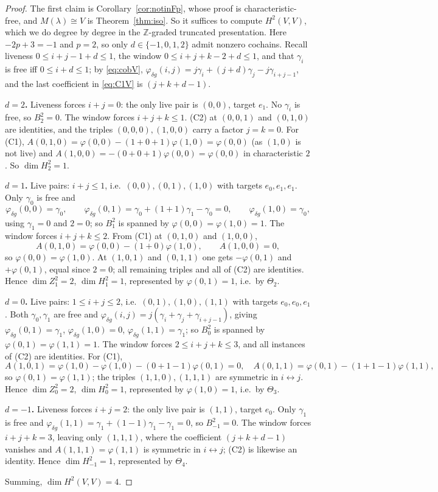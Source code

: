 \documentclass[11pt,reqno]{amsart}
\theoremstyle{plain}
\theoremstyle{definition}
\newcommand{\Zt}{Z^2}
\newcommand{\Bt}{B^2}
\newcommand{\Ht}{H^2}
\begin{document}
\begin{proof}
The first claim is Corollary~\ref{cor:notinFp}, whose proof is characteristic-free, and
$M(\lambda)\cong V$ is Theorem~\ref{thm:iso}. So it suffices to compute $\Ht(V,V)$, which we
do degree by degree in the $\mathbb{Z}$-graded truncated presentation. Here
$-2p+3=-1$ and $p=2$, so only $d\in\{-1,0,1,2\}$ admit nonzero cochains. Recall liveness
$0\le i+j-1+d\le1$, the window $0\le i+j+k-2+d\le1$, and that $\gamma_i$ is free iff
$0\le i+d\le1$; by \eqref{eq:cobV},
$\varphi_{\delta g}(i,j)=j\gamma_i+(j+d)\gamma_j-j\gamma_{i+j-1}$, and the last coefficient
in \eqref{eq:C1V} is $(j+k+d-1)$.

\textbf{$d=2$.} Liveness forces $i+j=0$: the only live pair is $(0,0)$, target $e_1$. No
$\gamma_i$ is free, so $\Bt_2=0$. The window forces $i+j+k\le1$. (C2) at $(0,0,1)$ and
$(0,1,0)$ are identities, and the triples $(0,0,0),(1,0,0)$ carry a factor $j=k=0$. For
(C1), $A(0,1,0)=\varphi(0,0)-(1+0+1)\varphi(1,0)=\varphi(0,0)$ (as $(1,0)$ is not live) and
$A(1,0,0)=-(0+0+1)\varphi(0,0)=\varphi(0,0)$ in characteristic $2$. So $\dim\Ht_2=1$.

\textbf{$d=1$.} Live pairs: $i+j\le1$, i.e.\ $(0,0),(0,1),(1,0)$ with targets $e_0,e_1,e_1$.
Only $\gamma_0$ is free and
\[
\varphi_{\delta g}(0,0)=\gamma_0,\qquad
\varphi_{\delta g}(0,1)=\gamma_0+(1+1)\gamma_1-\gamma_0=0,\qquad
\varphi_{\delta g}(1,0)=\gamma_0,
\]
using $\gamma_1=0$ and $2=0$; so $\Bt_1$ is spanned by $\varphi(0,0)=\varphi(1,0)=1$. The
window forces $i+j+k\le2$. From (C1) at $(0,1,0)$ and $(1,0,0)$,
\[
A(0,1,0)=\varphi(0,0)-(1+0)\varphi(1,0),\qquad A(1,0,0)=0,
\]
so $\varphi(0,0)=\varphi(1,0)$. At $(1,0,1)$ and $(0,1,1)$ one gets $-\varphi(0,1)$ and
$+\varphi(0,1)$, equal since $2=0$; all remaining triples and all of (C2) are identities.
Hence $\dim\Zt_1=2$, $\dim\Ht_1=1$, represented by $\varphi(0,1)=1$, i.e.\ by $\Theta_2$.

\textbf{$d=0$.} Live pairs: $1\le i+j\le2$, i.e.\ $(0,1),(1,0),(1,1)$ with targets
$e_0,e_0,e_1$. Both $\gamma_0,\gamma_1$ are free and
$\varphi_{\delta g}(i,j)=j(\gamma_i+\gamma_j+\gamma_{i+j-1})$, giving
$\varphi_{\delta g}(0,1)=\gamma_1$, $\varphi_{\delta g}(1,0)=0$,
$\varphi_{\delta g}(1,1)=\gamma_1$; so $\Bt_0$ is spanned by
$\varphi(0,1)=\varphi(1,1)=1$. The window forces $2\le i+j+k\le3$, and all instances of (C2)
are identities. For (C1),
\[
A(1,0,1)=\varphi(1,0)-\varphi(1,0)-(0+1-1)\varphi(0,1)=0,\quad
A(0,1,1)=\varphi(0,1)-(1+1-1)\varphi(1,1),
\]
so $\varphi(0,1)=\varphi(1,1)$; the triples $(1,1,0),(1,1,1)$ are symmetric in
$i\leftrightarrow j$. Hence $\dim\Zt_0=2$, $\dim\Ht_0=1$, represented by
$\varphi(1,0)=1$, i.e.\ by $\Theta_3$.

\textbf{$d=-1$.} Liveness forces $i+j=2$: the only live pair is $(1,1)$, target $e_0$. Only
$\gamma_1$ is free and
$\varphi_{\delta g}(1,1)=\gamma_1+(1-1)\gamma_1-\gamma_1=0$, so $\Bt_{-1}=0$. The window
forces $i+j+k=3$, leaving only $(1,1,1)$, where the coefficient $(j+k+d-1)$ vanishes and
$A(1,1,1)=\varphi(1,1)$ is symmetric in $i\leftrightarrow j$; (C2) is likewise an identity.
Hence $\dim\Ht_{-1}=1$, represented by $\Theta_4$.

Summing, $\dim\Ht(V,V)=4$.
\end{proof}
\end{document}
